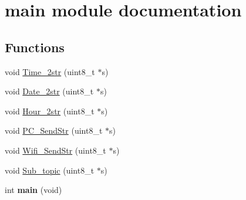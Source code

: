 \hypertarget{group__main__module}{\section{main module documentation}
\label{group__main__module}
}
\subsection*{Functions}
\begin{DoxyCompactItemize}
\item 
void \hyperlink{group__main__module_gaf2367cbc2819e1ba2631c4b01a288381}{Time\-\_\-2str} (uint8\-\_\-t $\ast$s)
\item 
void \hyperlink{group__main__module_ga4f6e3e920433e1be2b5384086da2e9d4}{Date\-\_\-2str} (uint8\-\_\-t $\ast$s)
\item 
void \hyperlink{group__main__module_ga9d75e1014be4cbddbc2c81e4b8351fcb}{Hour\-\_\-2str} (uint8\-\_\-t $\ast$s)
\item 
void \hyperlink{group__main__module_ga6c4eddfaadeaacb5b329ea70b8ecd62f}{P\-C\-\_\-\-Send\-Str} (uint8\-\_\-t $\ast$s)
\item 
void \hyperlink{group__main__module_ga6c1c002e2f188399648513f7142dc3e4}{Wifi\-\_\-\-Send\-Str} (uint8\-\_\-t $\ast$s)
\item 
void \hyperlink{group__main__module_gae80e358e13cc19e9abec5616e898f736}{Sub\-\_\-topic} (uint8\-\_\-t $\ast$s)
\item 
\hypertarget{group__main__module_ga840291bc02cba5474a4cb46a9b9566fe}{int {\bfseries main} (void)}\label{group__main__module_ga840291bc02cba5474a4cb46a9b9566fe}

\end{DoxyCompactItemize}
